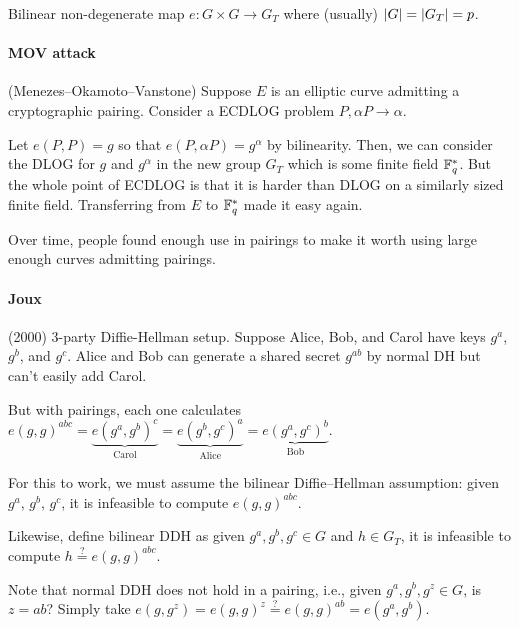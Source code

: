 \documentclass[notes]{agony}
\begin{document}
\begin{defn}
  Bilinear non-degenerate map $e : G \times G \to G_T$
  where (usually) $\abs{G} = \abs{G_T} = p$.
\end{defn}\spewnotes

\paragraph{MOV attack} (Menezes--Okamoto--Vanstone)
Suppose $E$ is an elliptic curve admitting a cryptographic pairing.
Consider a ECDLOG problem $P, \alpha P \to \alpha$.

Let $e(P,P) = g$ so that $e(P,\alpha P) = g^\alpha$ by bilinearity.
Then, we can consider the DLOG for $g$ and $g^\alpha$ in the new group $G_T$
which is some finite field $\mathbb{F}_q^*$.
But the whole point of ECDLOG is that it is harder than DLOG on a similarly sized finite field.
Transferring from $E$ to $\mathbb{F}_q^*$ made it easy again.

Over time, people found enough use in pairings to make it worth using
large enough curves admitting pairings.

\paragraph{Joux} (2000) 3-party Diffie-Hellman setup.
Suppose Alice, Bob, and Carol have keys $g^a$, $g^b$, and $g^c$.
Alice and Bob can generate a shared secret $g^{ab}$ by normal DH
but can't easily add Carol.

But with pairings, each one calculates $e(g,g)^{abc}
  = \underbrace{e(g^a,g^b)^c}_{\text{Carol}}
  = \underbrace{e(g^b,g^c)^a}_{\text{Alice}}
  = \underbrace{e(g^a,g^c)^b}_{\text{Bob}}$.

For this to work, we must assume the bilinear Diffie--Hellman assumption:
given $g^a$, $g^b$, $g^c$, it is infeasible to compute $e(g,g)^{abc}$.

Likewise, define bilinear DDH as given $g^a,g^b,g^c \in G$ and $h \in G_T$,
it is infeasible to compute $h \stackrel{?}{=} e(g,g)^{abc}$.

Note that normal DDH does not hold in a pairing, i.e.,
given $g^a,g^b,g^z \in G$, is $z = ab$?
Simply take $e(g,g^z) = e(g,g)^z \stackrel{?}{=} e(g,g)^{ab} = e(g^a,g^b)$.
\end{document}
